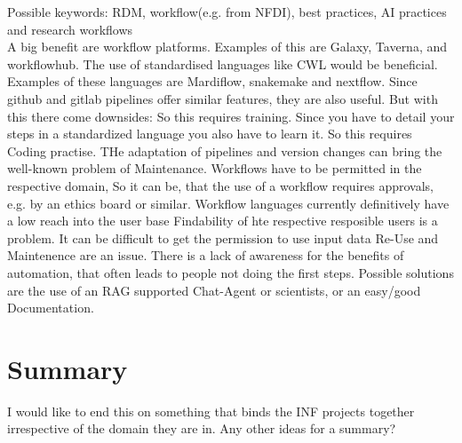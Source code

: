 \documentclass{eceasst}
\begin{document}
Possible keywords: RDM, workflow(e.g. from NFDI), best practices, AI practices and research workflows\\

A big benefit are workflow platforms. Examples of this are Galaxy, Taverna, and workflowhub. The use of standardised languages like CWL would be beneficial.
Examples of these languages are Mardiflow, snakemake and nextflow. Since github and gitlab pipelines offer similar features, they are also useful.
But with this there come downsides:
So this requires training. Since you have to detail your steps in a standardized language you also have to learn it. So this requires Coding practise.
THe adaptation of pipelines and version changes can bring the well-known problem of Maintenance.
Workflows have to be permitted in the respective domain, So it can be, that the use of a workflow requires approvals, e.g. by an ethics board or similar.
Workflow languages currently definitively have a low reach into the user base
Findability of hte respective resposible users is a problem.
It can be difficult to get the permission to use input data
Re-Use and Maintenence are an issue.
There is a lack of awareness for the benefits of automation, that often leads to people not doing the first steps.
Possible solutions are the use of an RAG supported Chat-Agent or scientists, or an easy/good Documentation.

\section{Summary}
I would like to end this on something that binds the INF projects together irrespective of the domain they are in.
Any other ideas for a summary?
\end{document}
